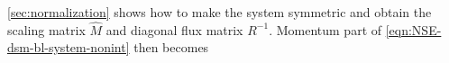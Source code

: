 \documentclass{article}
\numberwithin{equation}{section}
\begin{document}
\cref{sec:normalization} shows how to make the system symmetric and obtain the scaling matrix $\hat{M}$ and diagonal flux matrix $R^{-1}$. Momentum part of \cref{eqn:NSE-dsm-bl-system-nonint} then becomes
\end{document}
